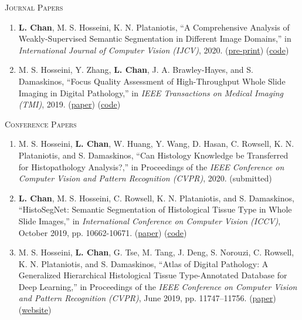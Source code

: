 \documentclass[11pt]{cv_style}
\begin{document}
\textsc{Journal Papers}
\begin{enumerate}
	\item \textbf{L. Chan}, M. S. Hosseini, K. N. Plataniotis, ``A Comprehensive Analysis of Weakly-Supervised Semantic Segmentation in Different Image Domains,'' in \emph{International Journal of Computer Vision (IJCV)}, 2020. (\href{https://arxiv.org/pdf/1912.11186.pdf}{pre-print}) (\href{https://github.com/lyndonchan/wsss-analysis}{code})
	\item M. S. Hosseini, Y. Zhang, \textbf{L. Chan}, J. A. Brawley-Hayes, and S. Damaskinos, ``Focus Quality Assessment of High-Throughput Whole Slide Imaging in Digital Pathology,'' in \emph{IEEE Transactions on Medical Imaging (TMI)}, 2019. (\href{https://ieeexplore.ieee.org/abstract/document/8725582}{paper}) (\href{https://github.com/mahdihosseini/FQPath}{code})
\end{enumerate}
\newpage
\textsc{Conference Papers}
\begin{enumerate}
	\item M. S. Hosseini, \textbf{L. Chan}, W. Huang, Y. Wang, D. Hasan, C. Rowsell, K. N. Plataniotis, and S. Damaskinos, ``Can Histology Knowledge be Transferred for Histopathology Analysis?,'' in Proceedings of the \emph{IEEE Conference on Computer Vision and Pattern Recognition (CVPR)}, 2020. (submitted)
	\item \textbf{L. Chan}, M. S. Hosseini, C. Rowsell, K. N. Plataniotis, and S. Damaskinos, ``HistoSegNet: Semantic Segmentation of Histological Tissue Type in Whole Slide Images,'' in \emph{International Conference on Computer Vision (ICCV)}, October 2019, pp. 10662-10671. (\href{http://openaccess.thecvf.com/content_ICCV_2019/papers/Chan_HistoSegNet_Semantic_Segmentation_of_Histological_Tissue_Type_in_Whole_Slide_ICCV_2019_paper.pdf}{paper}) (\href{https://github.com/lyndonchan/hsn_v1}{code})
	\item M. S. Hosseini, \textbf{L. Chan}, G. Tse, M. Tang, J. Deng, S. Norouzi, C. Rowsell, K. N. Plataniotis, and S. Damaskinos, ``Atlas of Digital Pathology: A Generalized Hierarchical Histological Tissue Type-Annotated Database for Deep Learning,'' in Proceedings of the \emph{IEEE Conference on Computer Vision and Pattern Recognition (CVPR)}, June 2019, pp. 11747–11756. (\href{http://openaccess.thecvf.com/content_CVPR_2019/html/Hosseini_Atlas_of_Digital_Pathology_A_Generalized_Hierarchical_Histological_Tissue_Type-Annotated_CVPR_2019_paper.html}{paper}) (\href{http://www.dsp.utoronto.ca/projects/ADP/}{website})
\end{enumerate}
\end{document}
